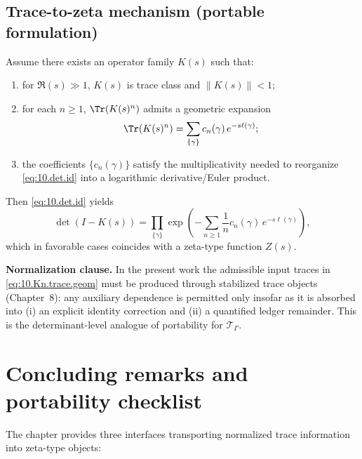 \subsection{Trace-to-zeta mechanism (portable formulation)}
\label{subsec:10.det.mechanism}

Assume there exists an operator family $K(s)$ such that:
\begin{enumerate}
\item for $\Re(s)\gg1$, $K(s)$ is trace class and $\|K(s)\|<1$;
\item for each $n\ge1$, $\Tr(K(s)^n)$ admits a geometric expansion
\begin{equation}\label{eq:10.Kn.trace.geom}
\Tr(K(s)^n)=\sum_{\{\gamma\}} c_n(\gamma)\,e^{-s\ell(\gamma)};
\end{equation}
\item the coefficients $\{c_n(\gamma)\}$ satisfy the multiplicativity needed to reorganize \eqref{eq:10.det.id} into a logarithmic
derivative/Euler product.
\end{enumerate}
Then \eqref{eq:10.det.id} yields
\begin{equation}\label{eq:10.euler.product}
\det(I-K(s))
=
\prod_{\{\gamma\}}
\exp\!\left(-\sum_{n\ge1}\frac{1}{n}c_n(\gamma)\,e^{-s\ell(\gamma)}\right),
\end{equation}
which in favorable cases coincides with a zeta-type function $Z(s)$.

\medskip
\noindent\textbf{Normalization clause.}
In the present work the admissible input traces in \eqref{eq:10.Kn.trace.geom} must be produced through stabilized trace objects
(Chapter~8): any auxiliary dependence is permitted only insofar as it is absorbed into (i) an explicit identity correction and
(ii) a quantified ledger remainder. This is the determinant-level analogue of portability for $\mathcal T_\Gamma$.

\section{Concluding remarks and portability checklist}
\label{sec:10.conclusion}

The chapter provides three interfaces transporting normalized trace information into zeta-type objects:

